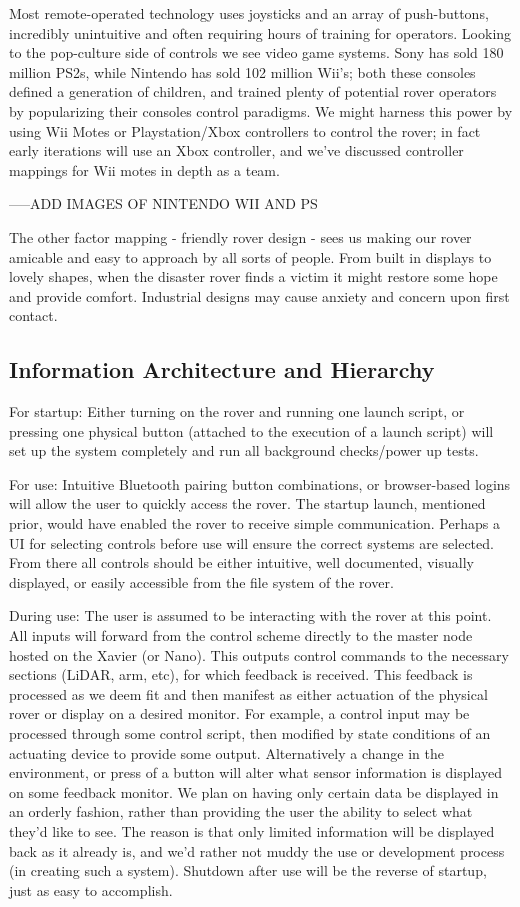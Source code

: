 \documentclass[a4paper, 10pt]{article}
\begin{document}
	Most remote-operated technology uses joysticks and an array of push-buttons, incredibly unintuitive and often requiring hours of training for operators. Looking to the pop-culture side of controls we see video game systems. Sony has sold 180 million PS2s, while Nintendo has sold 102 million Wii's; both these consoles defined a generation of children, and trained plenty of potential rover operators by popularizing their consoles control paradigms. We might harness this power by using Wii Motes or Playstation/Xbox controllers to control the rover; in fact early iterations will use an Xbox controller, and we've discussed controller mappings for Wii motes in depth as a team.
	
	-----ADD IMAGES OF NINTENDO WII AND PS
	
	The other factor mapping - friendly rover design - sees us making our rover amicable and easy to approach by all sorts of people. From built in displays to lovely shapes, when the disaster rover finds a victim it might restore some hope and provide comfort. Industrial designs may cause anxiety and concern upon first contact.
	
	\subsection{Information Architecture and Hierarchy}	
	For startup: Either turning on the rover and running one launch script, or pressing one physical button (attached to the execution of a launch script) will set up the system completely and run all background checks/power up tests. 

	For use: Intuitive Bluetooth pairing button combinations, or browser-based logins will allow the user to quickly access the rover. The startup launch, mentioned prior, would have enabled the rover to receive simple communication. Perhaps a UI for selecting controls before use will ensure the correct systems are selected. From there all controls should be either intuitive, well documented, visually displayed, or easily accessible from the file system of the rover. 

	During use: The user is assumed to be interacting with the rover at this point. All inputs will forward from the control scheme directly to the master node hosted on the Xavier (or Nano). This outputs control commands to the necessary sections (LiDAR, arm, etc), for which feedback is received. This feedback is processed as we deem fit and then manifest as either actuation of the physical rover or display on a desired monitor. For example, a control input may be processed through some control script, then modified by state conditions of an actuating device to provide some output. Alternatively a change in the environment, or press of a button will alter what sensor information is displayed on some feedback monitor. We plan on having only certain data be displayed in an orderly fashion, rather than providing the user the ability to select what they'd like to see. The reason is that only limited information will be displayed back as it already is, and we'd rather not muddy the use or development process (in creating such a system). Shutdown after use will be the reverse of startup, just as easy to accomplish.
\end{document}
